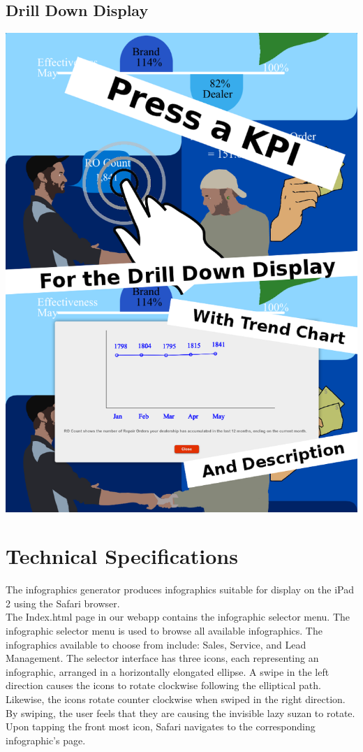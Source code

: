 \documentclass[11pt,a4paper,oneside]{article}
\begin{document}
\subsection{Drill Down Display}
\includegraphics[width=.6\textwidth]{images/fun.png}\\


\newpage

\section{Technical Specifications}

The infographics generator produces infographics suitable for display on the iPad 2 using the Safari browser.\\

The Index.html page in our webapp contains the infographic selector menu. The infographic selector menu is used to browse all available infographics. The infographics available to choose from include: Sales, Service, and Lead Management. The selector interface has three icons, each representing an infographic, arranged in a horizontally elongated ellipse. A swipe in the left direction causes the icons to rotate clockwise following the elliptical path. Likewise, the icons rotate counter clockwise when swiped in the right direction. By swiping, the user feels that they are causing the invisible lazy suzan to rotate. Upon tapping the front most icon, Safari navigates to the corresponding infographic's page.\\
\end{document}

